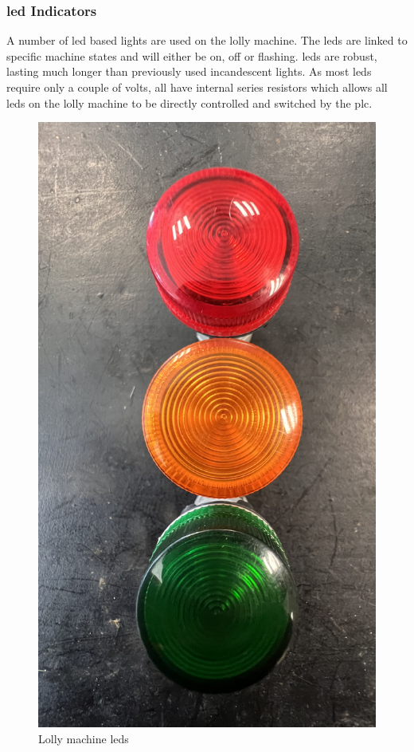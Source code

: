     \subsubsection{\acrshort{led} Indicators}
        A number of \acrshort{led} based lights are used on the lolly machine. The \acrshort{led}s are linked to specific machine states and will either be on, off  or flashing. \acrshort{led}s are robust, lasting much longer than previously used incandescent lights. As most \acrshort{led}s require only a couple of volts, all have internal series resistors which allows all \acrshort{led}s on the lolly machine to be directly controlled and switched by the \acrshort{plc}.
        
        
        \begin{figure}[H]
            \centering
            \includegraphics[scale = 0.3]{2_images/leds.png}
            \caption{Lolly machine \acrshort{led}s}
            \label{fig:leds}
        \end{figure} 
        
